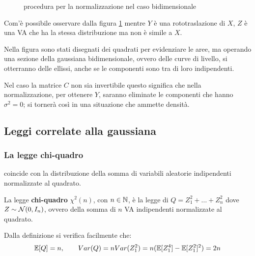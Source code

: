 \begin{ese}
\begin{figure}[ht]

    \caption{procedura per la normalizzazione nel caso bidimensionale}
    \label{Z-bidimensionale}
  \end{figure}

  Com'è possibile osservare dalla figura \ref{Z-bidimensionale} mentre $Y$ è una rototraslazione di $X$, $Z$ è una VA che ha la stessa distribuzione ma non è simile a $X$.

  Nella figura sono stati disegnati dei quadrati per evidenziare le aree, ma operando una sezione della gaussiana bidimensionale, ovvero delle curve di livello, si otterranno delle ellissi, anche se le componenti sono tra di loro indipendenti.

  Nel caso la matrice $C$ non sia invertibile questo significa che nella normalizzazione, per ottenere $Y$, saranno eliminate le componenti che hanno $\sigma^2 = 0$; si tornerà così in una situazione che ammette densità.
\end{ese}

\subsection{Leggi correlate alla gaussiana}

\subsubsection{La legge chi-quadro}

 coincide con la distribuzione della somma di variabili aleatorie indipendenti normalizzate al quadrato.

\medskip
\begin{defn}
  La legge \textbf{chi-quadro} $\chi^2(n)$, con $n \in \mathbb N$, è la legge di $Q=Z_1^2+ \dots + Z_n^2$ dove $Z \sim \mathcal N(0, I_n)$, ovvero della somma di $n$ VA indipendenti normalizzate al quadrato.
\end{defn}
Dalla definizione si verifica facilmente che:
$$\mathbb E[Q]=n, \qquad Var(Q)=nVar(Z_1^2)=n(\mathbb E[Z_1^4]-\mathbb E[Z_1^2]^2)=2n$$

